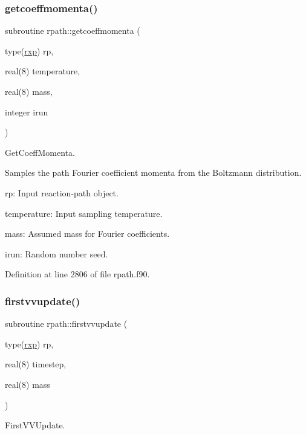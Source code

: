 \subsubsection{\texorpdfstring{getcoeffmomenta()}{getcoeffmomenta()}}
{\footnotesize\ttfamily subroutine rpath\+::getcoeffmomenta (\begin{DoxyParamCaption}\item[{type(\mbox{\hyperlink{structrpath_1_1rxp}{rxp}})}]{rp,  }\item[{real(8)}]{temperature,  }\item[{real(8)}]{mass,  }\item[{integer}]{irun }\end{DoxyParamCaption})}



Get\+Coeff\+Momenta. 

Samples the path Fourier coefficient momenta from the Boltzmann distribution.


\begin{DoxyItemize}
\item rp\+: Input reaction-\/path object.
\item temperature\+: Input sampling temperature.
\item mass\+: Assumed mass for Fourier coefficients.
\item irun\+: Random number seed. 
\end{DoxyItemize}

Definition at line 2806 of file rpath.\+f90.

\mbox{\label{namespacerpath_a7fee98f4bae0eeddfeb9c7a7a0cd36de}} 
\subsubsection{\texorpdfstring{firstvvupdate()}{firstvvupdate()}}
{\footnotesize\ttfamily subroutine rpath\+::firstvvupdate (\begin{DoxyParamCaption}\item[{type(\mbox{\hyperlink{structrpath_1_1rxp}{rxp}})}]{rp,  }\item[{real(8)}]{timestep,  }\item[{real(8)}]{mass }\end{DoxyParamCaption})}



First\+V\+V\+Update. 

